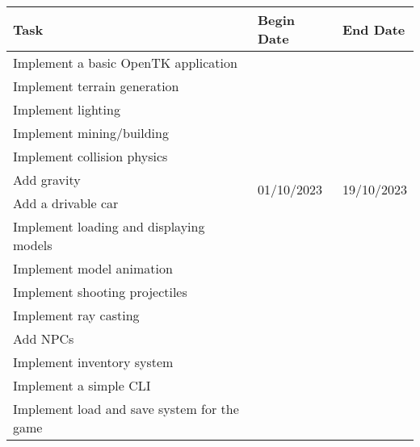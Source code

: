 \documentclass[12pt]{article}
\begin{document}
\begin{table}[H]
	\begin{tabular}{lll}
		\hline
		\textbf{Task}                                       & \textbf{Begin Date}          & \textbf{End Date}            \\ \hline
		Implement a basic OpenTK application                & \multirow{11}{*}{01/10/2023} & \multirow{11}{*}{19/10/2023} \\
		Implement terrain generation                        &                              &                              \\
		Implement lighting                                  &                              &                              \\
		Implement mining/building                           &                              &                              \\
		Implement collision physics                         &                              &                              \\
		Add gravity                                         &                              &                              \\
		Add a drivable car                                  &                              &                              \\
		Implement loading and displaying models             &                              &                              \\
		Implement model animation                           &                              &                              \\
		Implement shooting projectiles                      &                              &                              \\
		Implement ray casting                               &                              &                              \\
		Add NPCs                                            &                              &                              \\
		Implement inventory system                          &                              &                              \\
		Implement a simple CLI                              &                              &                              \\
		Implement load and save system for the game         &                              &                              \\ \hline

\end{tabular}
\end{table}
\end{document}
